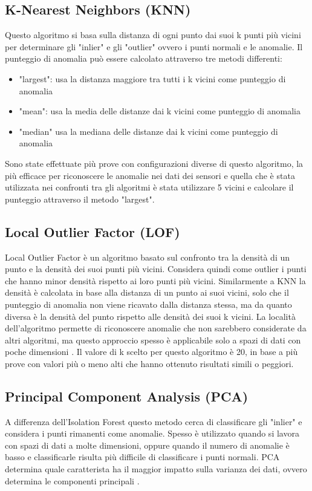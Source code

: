 \subsection{K-Nearest Neighbors (KNN)}
Questo algoritmo si basa sulla distanza di ogni punto dai suoi k punti più vicini per determinare gli "inlier" e gli "outlier" ovvero i punti normali e le anomalie\cite{KNN}. Il punteggio di anomalia può essere calcolato attraverso tre metodi differenti: 	
\begin{itemize}
	\item "largest": usa la distanza maggiore tra tutti i k vicini come punteggio di anomalia
	\item "mean": usa la media delle distanze dai k vicini come punteggio di anomalia
	\item "median" usa la mediana delle distanze dai k vicini come punteggio di anomalia
\end{itemize}
Sono state effettuate più prove con configurazioni diverse di questo algoritmo, la più efficace per riconoscere le anomalie nei dati dei sensori e quella che è stata utilizzata nei confronti tra gli algoritmi è stata utilizzare 5 vicini e calcolare il punteggio attraverso il metodo "largest".

\subsection{Local Outlier Factor (LOF)}
Local Outlier Factor è un algoritmo basato sul confronto tra la densità di un punto e la densità dei suoi punti più vicini. Considera quindi come outlier i punti che hanno minor densità rispetto ai loro punti più vicini. Similarmente a KNN la densità è calcolata in base alla distanza di un punto ai suoi vicini, solo che il punteggio di anomalia non viene ricavato dalla distanza stessa, ma da quanto diversa è la densità del punto rispetto alle densità dei suoi k vicini.
La località dell'algoritmo permette di riconoscere anomalie che non sarebbero considerate da altri algoritmi, ma questo approccio spesso è applicabile solo a spazi di dati con poche dimensioni \cite{LOF}.
Il valore di k scelto per questo algoritmo è 20, in base a più prove con valori più o meno alti che hanno ottenuto risultati simili o peggiori.

\subsection{Principal Component Analysis (PCA)}
A differenza dell'Isolation Forest questo metodo cerca di classificare gli "inlier" e considera i punti rimanenti come anomalie. Spesso è utilizzato quando si lavora con spazi di dati a molte dimensioni, oppure quando il numero di anomalie è basso e classificarle risulta più difficile di classificare i punti normali. PCA determina quale caratterista ha il maggior impatto sulla varianza dei dati, ovvero determina le componenti principali \cite{PCA}.

